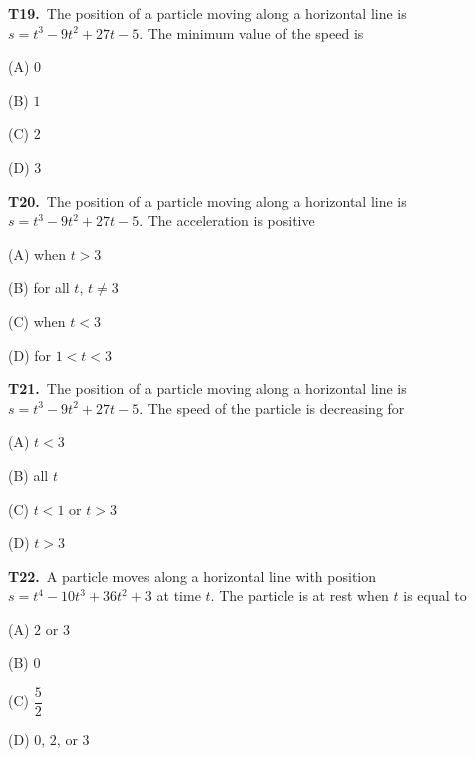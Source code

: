 \documentclass[11pt]{article}
\begin{document}
\bigskip\noindent\textbf{T19.}\ The position of a particle moving along a horizontal line is $s=t^3-9t^2+27t-5$. The minimum value of the speed is
\begin{list}{}{\setlength{\leftmargin}{3em}\setlength{\labelwidth}{2.5em}\setlength{\itemsep}{0pt}\setlength{\topsep}{2pt}}
\item[(A)] $0$
\item[(B)] $1$
\item[(C)] $2$
\item[(D)] $3$
\end{list}

\bigskip\noindent\textbf{T20.}\ The position of a particle moving along a horizontal line is $s=t^3-9t^2+27t-5$. The acceleration is positive
\begin{list}{}{\setlength{\leftmargin}{3em}\setlength{\labelwidth}{2.5em}\setlength{\itemsep}{0pt}\setlength{\topsep}{2pt}}
\item[(A)] when $t>3$
\item[(B)] for all $t$, $t \neq 3$
\item[(C)] when $t<3$
\item[(D)] for $1<t<3$
\end{list}

\bigskip\noindent\textbf{T21.}\ The position of a particle moving along a horizontal line is $s=t^3-9t^2+27t-5$. The speed of the particle is decreasing for
\begin{list}{}{\setlength{\leftmargin}{3em}\setlength{\labelwidth}{2.5em}\setlength{\itemsep}{0pt}\setlength{\topsep}{2pt}}
\item[(A)] $t<3$
\item[(B)] all $t$
\item[(C)] $t<1$ or $t>3$
\item[(D)] $t>3$
\end{list}

\bigskip\noindent\textbf{T22.}\ A particle moves along a horizontal line with position $s=t^4-10t^3+36t^2+3$ at time $t$. The particle is at rest when $t$ is equal to
\begin{list}{}{\setlength{\leftmargin}{3em}\setlength{\labelwidth}{2.5em}\setlength{\itemsep}{0pt}\setlength{\topsep}{2pt}}
\item[(A)] $2$ or $3$
\item[(B)] $0$
\item[(C)] $\dfrac{5}{2}$
\item[(D)] $0$, $2$, or $3$
\end{list}
\end{document}
